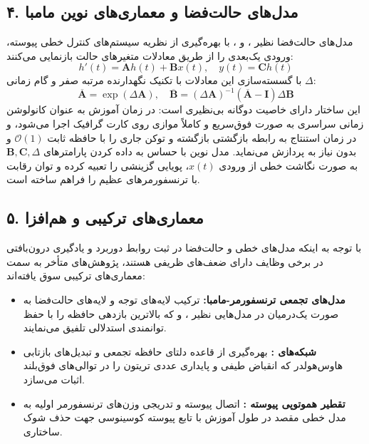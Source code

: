 \documentclass[12pt,a4paper]{report}
\theoremstyle{definition}
\begin{document}
\subsection{۴. مدل‌های حالت‌فضا و معماری‌های نوین مامبا }
مدل‌های حالت‌فضا  نظیر ،  و ، با بهره‌گیری از نظریه سیستم‌های کنترل خطی پیوسته، ورودی یک‌بعدی را از طریق معادلات متغیرهای حالت بازنمایی می‌کنند:
\begin{equation}
h'(t) = \mathbf{A} h(t) + \mathbf{B} x(t), \quad y(t) = \mathbf{C} h(t)
\end{equation}
با گسسته‌سازی این معادلات با تکنیک نگهدارنده مرتبه صفر  و گام زمانی $\Delta$:
\begin{equation}
\overline{\mathbf{A}} = \exp(\Delta \mathbf{A}), \quad \overline{\mathbf{B}} = (\Delta \mathbf{A})^{-1} (\overline{\mathbf{A}} - \mathbf{I}) \Delta \mathbf{B}
\end{equation}
این ساختار دارای خاصیت دوگانه بی‌نظیری است: در زمان آموزش به عنوان کانولوشن زمانی سراسری به صورت فوق‌سریع و کاملاً موازی روی کارت گرافیک اجرا می‌شود، و در زمان استنتاج به رابطه بازگشتی بازگشته و توکن جاری را با حافظه ثابت $\mathcal{O}(1)$ و بدون نیاز به  پردازش می‌نماید. مدل نوین  با حساس به داده کردن پارامترهای $\mathbf{B}, \mathbf{C}, \Delta$ به صورت نگاشت خطی از ورودی $x(t)$، پویایی گزینشی  را تعبیه کرده و توان رقابت با ترنسفورمرهای عظیم را فراهم ساخته است.

\subsection{۵. معماری‌های ترکیبی و هم‌افزا }
با توجه به اینکه مدل‌های خطی و حالت‌فضا در ثبت روابط دوربرد و یادگیری درون‌بافتی  در برخی وظایف دارای ضعف‌های ظریفی هستند، پژوهش‌های متأخر به سمت معماری‌های ترکیبی سوق یافته‌اند:
\begin{itemize}
    \item \textbf{مدل‌های تجمعی ترنسفورمر-مامبا:} ترکیب لایه‌های توجه و لایه‌های حالت‌فضا به صورت یک‌درمیان در مدل‌هایی نظیر ،  و  که بالاترین بازدهی حافظه را با حفظ توانمندی استدلالی تلفیق می‌نمایند.
    \item \textbf{شبکه‌های :} بهره‌گیری از قاعده دلتای حافظه تجمعی و تبدیل‌های بازتابی هاوس‌هولدر  که انقباض طیفی و پایداری عددی تریتون را در توالی‌های فوق‌بلند اثبات می‌سازد.
    \item \textbf{تقطیر هموتوپی پیوسته :} اتصال پیوسته و تدریجی وزن‌های ترنسفورمر اولیه به مدل خطی مقصد در طول آموزش با تابع پیوسته کوسینوسی جهت حذف شوک ساختاری.
\end{itemize}
\end{document}
